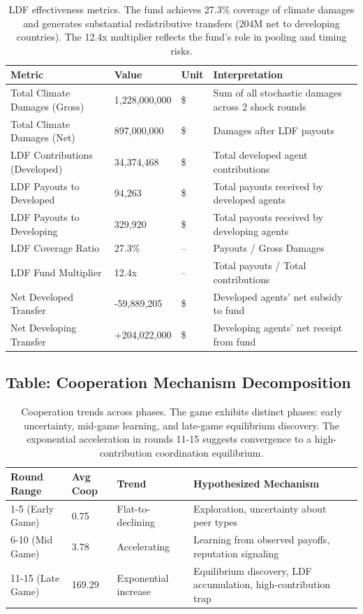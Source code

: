\documentclass[12pt]{article}
\begin{document}
\begin{table}[h]
\centering
\small
\begin{tabularx}{\textwidth}{lXXX}
\toprule
\textbf{Metric} & \textbf{Value} & \textbf{Unit} & \textbf{Interpretation} \\
\midrule
Total Climate Damages (Gross) & 1,228,000,000 & \$ & Sum of all stochastic damages across 2 shock rounds \\
Total Climate Damages (Net) & 897,000,000 & \$ & Damages after LDF payouts \\
LDF Contributions (Developed) & 34,374,468 & \$ & Total developed agent contributions \\
LDF Payouts to Developed & 94,263 & \$ & Total payouts received by developed agents \\
LDF Payouts to Developing & 329,920 & \$ & Total payouts received by developing agents \\
LDF Coverage Ratio & 27.3\% & -- & Payouts / Gross Damages \\
LDF Fund Multiplier & 12.4x & -- & Total payouts / Total contributions \\
Net Developed Transfer & -59,889,205 & \$ & Developed agents' net subsidy to fund \\
Net Developing Transfer & +204,022,000 & \$ & Developing agents' net receipt from fund \\
\bottomrule
\end{tabularx}
\caption{LDF effectiveness metrics. The fund achieves 27.3\% coverage of climate damages and generates substantial redistributive transfers (204M net to developing countries). The 12.4x multiplier reflects the fund's role in pooling and timing risks.}
\end{table}

\subsection*{Table: Cooperation Mechanism Decomposition}

\begin{table}[h]
\centering
\small
\begin{tabularx}{\textwidth}{lXXXX}
\toprule
\textbf{Round Range} & \textbf{Avg Coop} & \textbf{Trend} & \textbf{Hypothesized Mechanism} \\
\midrule
1-5 (Early Game) & 0.75 & Flat-to-declining & Exploration, uncertainty about peer types \\
6-10 (Mid Game) & 3.78 & Accelerating & Learning from observed payoffs, reputation signaling \\
11-15 (Late Game) & 169.29 & Exponential increase & Equilibrium discovery, LDF accumulation, high-contribution trap \\
\bottomrule
\end{tabularx}
\caption{Cooperation trends across phases. The game exhibits distinct phases: early uncertainty, mid-game learning, and late-game equilibrium discovery. The exponential acceleration in rounds 11-15 suggests convergence to a high-contribution coordination equilibrium.}
\end{table}
\end{document}
